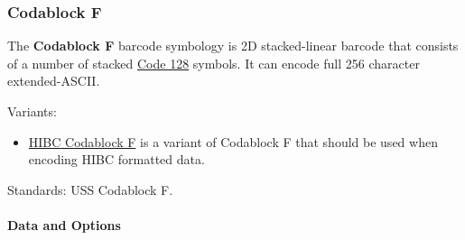 \hypertarget{codablock-f}{%
\subsubsection{Codablock F}\label{codablock-f}}

The \textbf{Codablock F} barcode symbology is 2D stacked-linear barcode
that consists of a number of stacked \protect\hyperlink{code-128}{Code
128} symbols. It can encode full 256 character extended-ASCII.

Variants:

\begin{itemize}
\tightlist
\item
  \protect\hyperlink{hibc-symbols}{HIBC Codablock F} is a variant of
  Codablock F that should be used when encoding HIBC formatted data.
\end{itemize}

Standards: USS Codablock F.

\hypertarget{data-and-options-62}{%
\paragraph{Data and Options}\label{data-and-options-62}}

